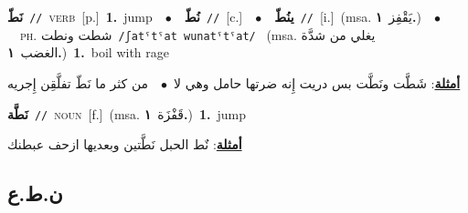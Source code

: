 \documentclass[10pt,a4paper,twoside]{article} %
\begin{document}
\begin{multicols}{2}
{\setlength\topsep{0pt}\textbf{\foreignlanguage{arabic}{نَطّ}}\ {\color{gray}\texttt{//}\color{black}}\ \textsc{verb}\ [p.]\ \textbf{1.}~jump\ \ $\bullet$\ \ \setlength\topsep{0pt}\textbf{\foreignlanguage{arabic}{نُطّ}}\ {\color{gray}\texttt{//}\color{black}}\ [c.]\ \ $\bullet$\ \ \setlength\topsep{0pt}\textbf{\foreignlanguage{arabic}{ينُطّ}}\ {\color{gray}\texttt{//}\color{black}}\ [i.]\ \color{gray}(msa. \foreignlanguage{arabic}{يَقْفِز}~\foreignlanguage{arabic}{\textbf{١.}})\color{black}\ \ $\bullet$\ \ \textsc{ph.} \color{gray} \foreignlanguage{arabic}{شطت ونطت}\color{black}\ {\color{gray}\texttt{/{\sffamily ʃatˤtˤat wunatˤtˤat}/}\color{black}}\ \color{gray} (msa. \foreignlanguage{arabic}{يغلي من شدَّة الغضب}~\foreignlanguage{arabic}{\textbf{١.}})\color{black}\ \textbf{1.}~boil with rage\  \begin{flushright}\color{gray}\foreignlanguage{arabic}{\textbf{\underline{\foreignlanguage{arabic}{أمثلة}}}: شَطَّت ونَطَّت بس دريت إِنه ضرتها حامل وهي لا\ $\bullet$\ \  من كثر ما نَطّ تفلَّقِن إِجريه}\end{flushright}\color{black}} \vspace{2mm}

{\setlength\topsep{0pt}\textbf{\foreignlanguage{arabic}{نَطَّة}}\ {\color{gray}\texttt{//}\color{black}}\ \textsc{noun}\ [f.]\ \color{gray}(msa. \foreignlanguage{arabic}{قَفْزَة}~\foreignlanguage{arabic}{\textbf{١.}})\color{black}\ \textbf{1.}~jump\  \begin{flushright}\color{gray}\foreignlanguage{arabic}{\textbf{\underline{\foreignlanguage{arabic}{أمثلة}}}: نٌط الحبل نَطَّتين وبعديها ازحف عبطنك}\end{flushright}\color{black}} \vspace{2mm}

\vspace{-3mm}
\subsection*{\color{blue}\foreignlanguage{arabic}{ن.ط.ع}\color{blue}{}} 


\end{multicols}
\end{document}
